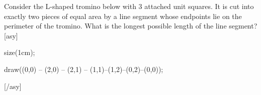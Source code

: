 Consider the L-shaped tromino below with 3 attached unit squares. It is cut into exactly two pieces of equal area by a line segment whose endpoints lie on the perimeter of the tromino. What is the longest possible length of the line segment?[asy]

size(1cm);

draw((0,0) -- (2,0) -- (2,1) -- (1,1)--(1,2)--(0,2)--(0,0));

[/asy]